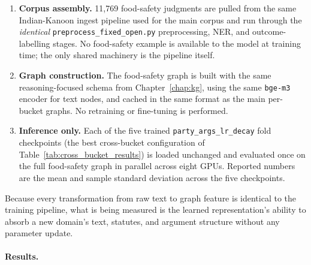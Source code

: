 \begin{enumerate}
  \item \textbf{Corpus assembly.}  11{,}769 food-safety judgments are
    pulled from the same Indian-Kanoon ingest pipeline used for the
    main corpus and run through the \emph{identical}
    \texttt{preprocess\_fixed\_open.py} preprocessing, NER, and
    outcome-labelling stages.  No food-safety example is available
    to the model at training time; the only shared machinery is the
    pipeline itself.
  \item \textbf{Graph construction.}  The food-safety graph is built
    with the same reasoning-focused schema from
    Chapter~\ref{chap:kg}, using the same \texttt{bge-m3} encoder
    for text nodes, and cached in the same format as the main
    per-bucket graphs.  No retraining or fine-tuning is performed.
  \item \textbf{Inference only.}  Each of the five trained
    \texttt{party\_args\_lr\_decay} fold checkpoints (the best
    cross-bucket configuration of
    Table~\ref{tab:cross_bucket_results}) is loaded unchanged and
    evaluated once on the full food-safety graph in parallel across
    eight GPUs.  Reported numbers are the mean and sample standard
    deviation across the five checkpoints.
\end{enumerate}

Because every transformation from raw text to graph feature is
identical to the training pipeline, what is being measured is the
learned representation's ability to absorb a new domain's text,
statutes, and argument structure without any parameter update.

\paragraph{Results.}

